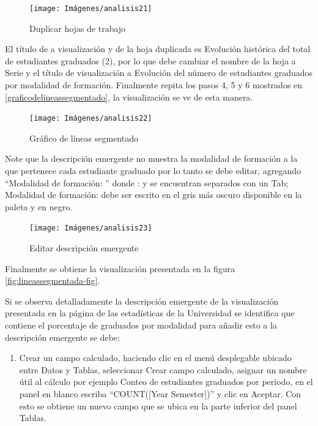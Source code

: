 \documentclass[
]{book}
\providecommand{\tightlist}{%
  \setlength{\itemsep}{0pt}\setlength{\parskip}{0pt}}
\begin{document}
\begin{figure}

{\centering \texttt{[image: Imágenes/analisis21]} 

}

\caption{Duplicar hojas de trabajo}\label{fig:duplicarhoja-fig}
\end{figure}

El título de a visualización y de la hoja duplicada es Evolución histórica del total de estudiantes graduados (2), por lo que debe cambiar el nombre de la hoja a Serie y el título de visualización a Evolución del número de estudiantes graduados por modalidad de formación. Finalmente repita los pasos 4, 5 y 6 mostrados en \ref{graficodelineassegmentado}, la visualización se ve de esta manera.

\begin{figure}

{\centering \texttt{[image: Imágenes/analisis22]} 

}

\caption{Gráfico de líneas segmentado}\label{fig:lineassegmentadoporduplicacion-fig}
\end{figure}

Note que la descripción emergente no muestra la modalidad de formación a la que pertenece cada estudiante graduado por lo tanto se debe editar, agregando ``Modalidad de formación: '' donde : y se encuentran separados con un Tab; Modalidad de formación: debe ser escrito en el gris más oscuro disponible en la paleta y en negro.

\begin{figure}

{\centering \texttt{[image: Imágenes/analisis23]} 

}

\caption{Editar descripción emergente}\label{fig:lineassegmentadodescripcion-fig}
\end{figure}

Finalmente se obtiene la visualización presentada en la figura \ref{fig:lineassegmentada-fig}.

Si se observa detalladamente la descripción emergente de la visualización presentada en la página de las estadísticas de la Universidad se identifica que contiene el porcentaje de graduados por modalidad para añadir esto a la descripción emergente se debe:

\begin{enumerate}
\def\labelenumi{\arabic{enumi}.}
\tightlist
\item
  Crear un campo calculado, haciendo clic en el menú desplegable ubicado entre Datos y Tablas, seleccionar Crear campo calculado, asignar un nombre útil al cálculo por ejemplo Conteo de estudiantes graduados por periodo, en el panel en blanco escriba ``COUNT({[}Year Semester{]})'' y clic en Aceptar. Con esto se obtiene un nuevo campo que se ubica en la parte inferior del panel Tablas.
\end{enumerate}
\end{document}
